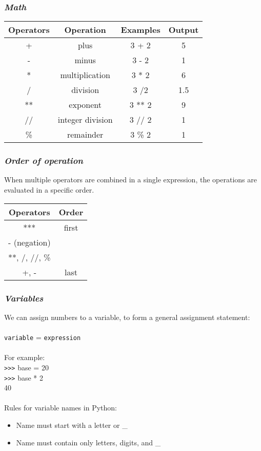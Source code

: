 \documentclass{article}
\begin{document}
{{{\subsubsection{\small\textsl{Math}}
\begin{table}[ht]
\begin{tabular}{c c c c}
Operators & Operation & Examples & Output \\
\hline
+ & plus & 3 + 2 & 5 \\
- & minus & 3 - 2 & 1 \\
\** & multiplication & 3 * 2 & 6 \\
/ & division & 3 /2 & 1.5 \\
\*** & exponent & 3 ** 2 & 9 \\
// & integer division  & 3 // 2 & 1 \\
\% & remainder & 3 \% 2 & 1 \\
\end{tabular}
\end{table}

\subsubsection{\small\textsl{Order of operation}}
When multiple operators are combined in a single expression, the operations are evaluated in a specific order.

\begin{table}[ht]
\begin{tabular}{c c}
Operators & Order\\
\hline
*** & first\\
- (negation) \\
**, /, //, \% \\
+, - & last \\
\end{tabular}
\end{table}

\subsubsection{\small\textsl{Variables}}
We can assign numbers to a variable, to form a general assignment statement:\\
\\
\texttt{variable} = \texttt{expression}\\
\\
For example:\\
\texttt{>>>} base = 20\\
\texttt{>>>} base * 2\\
40\\
\\
Rules for variable names in Python:
\begin{itemize}
\item Name must start with a letter or \_
\item Name must contain only letters, digits, and \_
\end{itemize}

}}}
\end{document}
